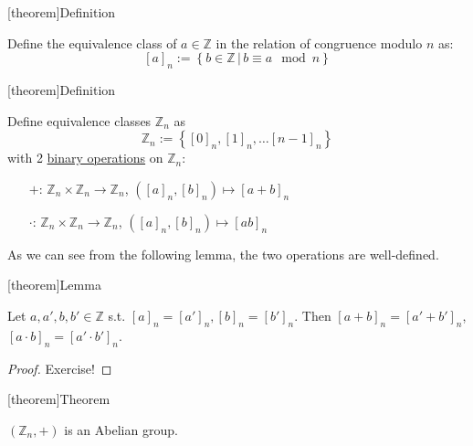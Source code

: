 \documentclass[12pt]{report}
\theoremstyle{definition}
\begin{document}
[theorem]{Definition}
\begin{equivalence classes}
    Define the equivalence class of $a \in \mathbb{Z}$ in the relation of congruence modulo $n$ as:\[
        {[a]}_n := \left\{ b \in \mathbb{Z} \,|\, b \equiv a \mod n \right\} 
    \]
\end{equivalence classes}

[theorem]{Definition}
\begin{group Zn}
    Define equivalence classes $\mathbb{Z}_n$ as\[
        \mathbb{Z}_n := \left\{{[0]}_n, {[1]}_n, \ldots {[n-1]}_n\right\} 
    \] with 2 \underline{binary operations} on $\mathbb{Z}_n$:
    \begin{itemize}
        \item[$+$:] $\mathbb{Z}_n \times \mathbb{Z}_n \rightarrow \mathbb{Z}_n$, 
            $({[a]}_{n}, {[b]}_{n}) \mapsto {[a + b]}_{n}$
        \item[$\cdot$:] $\mathbb{Z}_n \times \mathbb{Z}_n \rightarrow \mathbb{Z}_n$,
            $({[a]}_{n}, {[b]}_{n}) \mapsto {[ab]}_{n}$
    \end{itemize}
    As we can see from the following lemma, the two operations are well-defined.
\end{group Zn}

[theorem]{Lemma}
\begin{well-definied operations on Zn}
    Let $a, a', b, b' \in \mathbb{Z}$ s.t. ${[a]}_n = {[a']}_n, {[b]}_n = {[b']}_n$.
    Then ${[a + b]}_n = {[a' + b']}_n$, ${[a\cdot b]}_n = {[a' \cdot b']}_n$.
\end{well-definied operations on Zn}

\begin{proof}
    Exercise!
\end{proof}

[theorem]{Theorem}
\begin{Zn is Abelian}
    $(\mathbb{Z}_n, +)$ is an Abelian group.
\end{Zn is Abelian}
\end{document}
